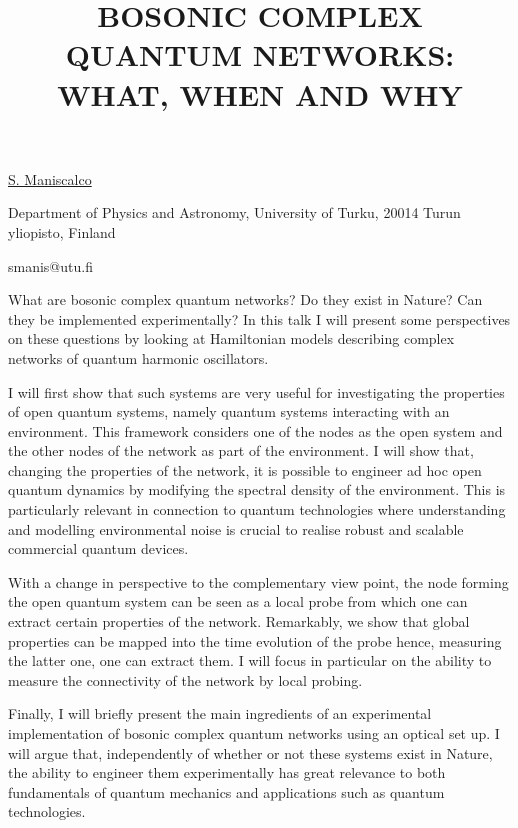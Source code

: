 \title{BOSONIC COMPLEX QUANTUM NETWORKS: WHAT, WHEN AND WHY}

\underline{S. Maniscalco} 

{\normalsize{\vspace{-4mm}
Department of Physics and Astronomy, University of Turku, 20014 Turun yliopisto, Finland



\email smanis@utu.fi}}

What are bosonic complex quantum networks? Do they exist in Nature? Can they be implemented experimentally?
In this talk I will present some perspectives on these questions by looking at Hamiltonian models describing complex networks of quantum harmonic oscillators.

I will first show that such systems are very useful for investigating the properties of open quantum systems, namely quantum systems interacting with an environment. This framework considers one of the nodes as the open system and the other nodes of the network as part of the environment. I will show that, changing the properties of the network, it is possible to engineer ad hoc open quantum dynamics by modifying the spectral density of the environment. This is particularly relevant in connection to quantum technologies where understanding and modelling environmental noise is crucial to realise robust and scalable commercial quantum devices.

With a change in perspective to the complementary view point, the node forming the open quantum system can be seen as a local probe from which one can extract certain properties of the network. Remarkably, we show that global properties can be mapped into the time evolution of the probe hence, measuring the latter one, one can extract them. I will focus in particular on the ability to measure the connectivity of the network by local probing.

Finally, I will briefly present the main ingredients of an experimental implementation of bosonic complex quantum networks using an optical set up. I will argue that, independently of whether or not these systems exist in Nature, the ability to engineer them experimentally has great relevance to both fundamentals of quantum mechanics and applications such as quantum technologies.

\vspace{\baselineskip}